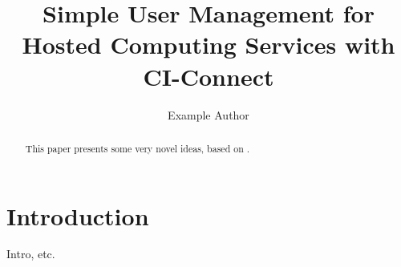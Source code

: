 \documentclass[sigconf]{acmart}
\begin{document}
\title{Simple User Management for Hosted Computing Services with CI-Connect}

\author{Example Author}

\renewcommand{\shortauthors}{Example, et al.}

\begin{abstract}
This paper presents some very novel ideas, based on \cite{dummy_paper}. 
\end{abstract}



\maketitle

\section{Introduction}

Intro, etc. 



\end{document}
